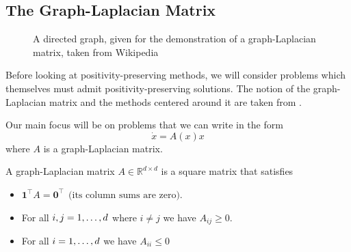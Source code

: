 \subsection{The Graph-Laplacian Matrix}

\begin{figure}
    \centering
    \caption{A directed graph, given for the demonstration of a graph-Laplacian matrix, taken from Wikipedia}
    \label{fig:graph1998}
\end{figure}

Before looking at positivity-preserving methods, we will consider problems which themselves must admit positivity-preserving solutions.
The notion of the graph-Laplacian matrix and the methods centered around it are taken from \cite{blanes_pos_2022}.

Our main focus will be on problems that we can write in the form 
\begin{equation*}
    \dot{x} = A(x)x
\end{equation*}
where $A$ is a graph-Laplacian matrix.

\begin{definition}
    A graph-Laplacian matrix $A \in \mathds{R}^{d \times d}$ is a square matrix that satisfies
    \begin{itemize}
        \item $\mathbf{1}^\intercal A = \mathbf{0}^\intercal ~~ \text{(its column sums are zero)}.$
        \item For all $i, j = 1, \mathellipsis, d$ where $i \ne j$ we have $A_{ij} \ge 0$.
        \item For all $i = 1, \mathellipsis, d$ we have $A_{ii} \le 0$
    \end{itemize}
\end{definition}

